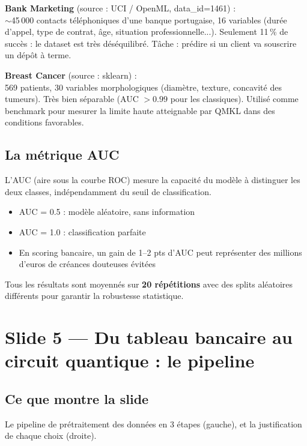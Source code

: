 \documentclass[12pt, a4paper]{article}
\begin{document}
\textbf{Bank Marketing} (source : UCI / OpenML, data\_id=1461) :\\
$\sim$45\,000 contacts téléphoniques d'une banque portugaise,
16 variables (durée d'appel, type de contrat, âge, situation professionnelle...).
Seulement 11\,\% de succès : le dataset est très déséquilibré.
Tâche : prédire si un client va souscrire un dépôt à terme.

\textbf{Breast Cancer} (source : sklearn) :\\
569 patients, 30 variables morphologiques (diamètre, texture, concavité des tumeurs).
Très bien séparable (AUC $> 0.99$ pour les classiques). Utilisé comme benchmark
pour mesurer la limite haute atteignable par QMKL dans des conditions favorables.

\subsection*{La métrique AUC}

L'AUC (aire sous la courbe ROC) mesure la capacité du modèle à distinguer
les deux classes, indépendamment du seuil de classification.
\begin{itemize}
  \item AUC = 0.5 : modèle aléatoire, sans information
  \item AUC = 1.0 : classification parfaite
  \item En scoring bancaire, un gain de 1--2 pts d'AUC peut représenter
        des millions d'euros de créances douteuses évitées
\end{itemize}

Tous les résultats sont moyennés sur \textbf{20 répétitions} avec des splits aléatoires
différents pour garantir la robustesse statistique.

\section{Slide 5 — Du tableau bancaire au circuit quantique : le pipeline}

\subsection*{Ce que montre la slide}

Le pipeline de prétraitement des données en 3 étapes (gauche),
et la justification de chaque choix (droite).
\end{document}
